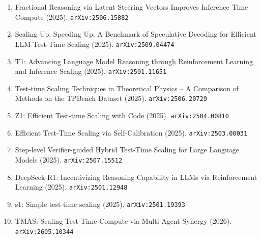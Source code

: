 \documentclass[11pt]{article}
\begin{document}
\begin{enumerate}
  \item Fractional Reasoning via Latent Steering Vectors Improves Inference Time Compute (2025). \texttt{arXiv:2506.15882}
  \item Scaling Up, Speeding Up: A Benchmark of Speculative Decoding for Efficient LLM Test-Time Scaling (2025). \texttt{arXiv:2509.04474}
  \item T1: Advancing Language Model Reasoning through Reinforcement Learning and Inference Scaling (2025). \texttt{arXiv:2501.11651}
  \item Test-time Scaling Techniques in Theoretical Physics -- A Comparison of Methods on the TPBench Dataset (2025). \texttt{arXiv:2506.20729}
  \item Z1: Efficient Test-time Scaling with Code (2025). \texttt{arXiv:2504.00810}
  \item Efficient Test-Time Scaling via Self-Calibration (2025). \texttt{arXiv:2503.00031}
  \item Step-level Verifier-guided Hybrid Test-Time Scaling for Large Language Models (2025). \texttt{arXiv:2507.15512}
  \item DeepSeek-R1: Incentivizing Reasoning Capability in LLMs via Reinforcement Learning (2025). \texttt{arXiv:2501.12948}
  \item s1: Simple test-time scaling (2025). \texttt{arXiv:2501.19393}
  \item TMAS: Scaling Test-Time Compute via Multi-Agent Synergy (2026). \texttt{arXiv:2605.10344}
\end{enumerate}
\end{document}
